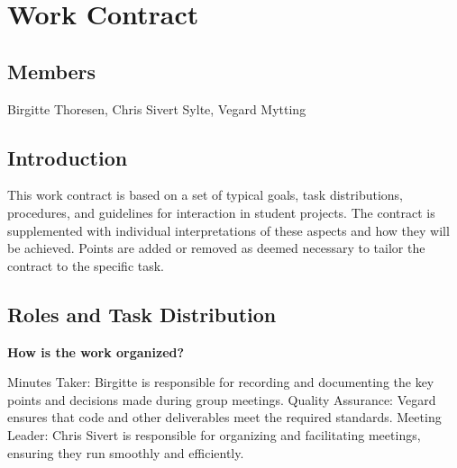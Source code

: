 \chapter{Work Contract}
\section*{Members}
Birgitte Thoresen, Chris Sivert Sylte, Vegard Mytting

\section*{Introduction}
This work contract is based on a set of typical goals, task distributions, procedures, and guidelines for interaction in student projects. The contract is supplemented with individual interpretations of these aspects and how they will be achieved.  
Points are added or removed as deemed necessary to tailor the contract to the specific task.  

\section*{Roles and Task Distribution}
\textbf{How is the work organized?}  

Minutes Taker: Birgitte is responsible for recording and documenting the key points and decisions made during group meetings.
Quality Assurance: Vegard ensures that code and other deliverables meet the required standards.
Meeting Leader: Chris Sivert is responsible for organizing and facilitating meetings, ensuring they run smoothly and efficiently.

